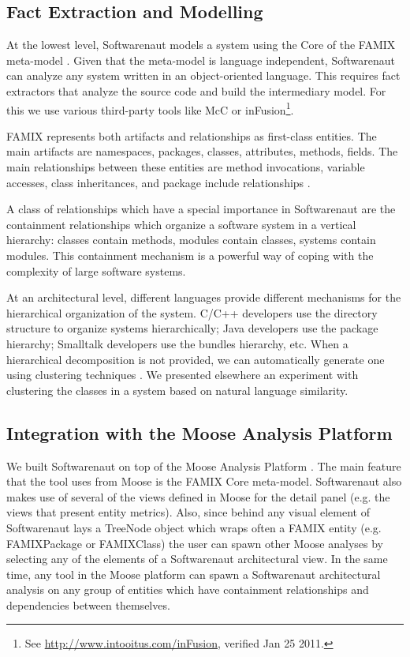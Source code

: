 \documentclass[preprint,12pt]{elsarticle}
\begin{document}
\subsection {Fact Extraction and Modelling} \label{sec:facts}

At the lowest level, Softwarenaut models a system using the Core of the FAMIX meta-model \cite{tichelaar-thesis}. Given that the meta-model is language independent, Softwarenaut can analyze any system written in an object-oriented language. This requires fact extractors that analyze the source code and build the intermediary model. For this we use various third-party tools like McC \cite{pepi-mcc} or inFusion\footnote{See \url{http://www.intooitus.com/inFusion}, verified Jan 25 2011.}.  

FAMIX represents both artifacts and relationships as first-class entities. The main artifacts are namespaces, packages, classes, attributes, methods, fields. The main relationships between these entities are method invocations, variable accesses, class inheritances, and package include relationships \cite{tichelaar-thesis}.

A class of relationships which have a special importance in Softwarenaut are the containment relationships which organize a software system in a vertical hierarchy: classes contain methods, modules contain classes, systems contain modules. This containment mechanism is a powerful way of coping with the complexity of large software systems.

At an architectural level, different languages provide different mechanisms for the hierarchical organization of the system. C/C++ developers use the directory structure to organize systems hierarchically; Java developers use the package hierarchy; Smalltalk developers use the bundles hierarchy, etc. 
When a hierarchical decomposition is not provided, we can automatically generate one using clustering techniques \cite{koschke-thesis}. We presented elsewhere an experiment with clustering the classes in a system based on natural language similarity\cite{Lung05a}.

\subsection {Integration with the Moose Analysis Platform}


We built Softwarenaut on top of the Moose Analysis Platform \cite{nier-story}. The main feature that the tool uses from Moose is the FAMIX Core meta-model. Softwarenaut also makes use of several of the views defined in Moose for the detail panel (e.g. the views that present entity metrics). Also, since behind any visual element of Softwarenaut lays a TreeNode object which wraps often a FAMIX entity (e.g. FAMIXPackage or FAMIXClass) the user can spawn other Moose analyses by selecting any of the elements of a Softwarenaut architectural view. In the same time, any tool in the Moose platform can spawn a Softwarenaut architectural analysis on any group of entities which have containment relationships and dependencies between themselves.
\end{document}
